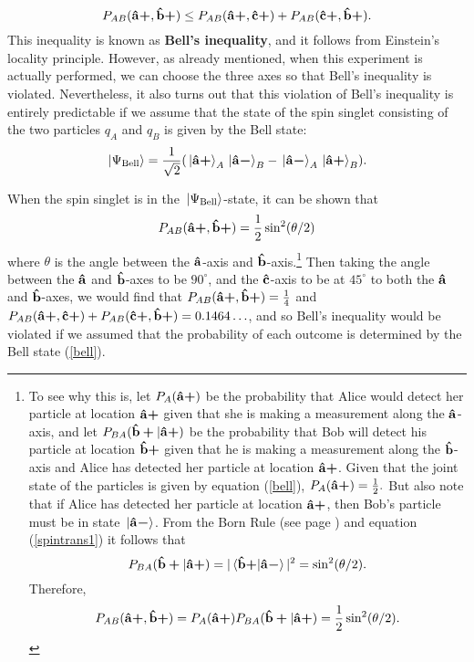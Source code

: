        \begin{equation}\label{bellinequality}
      P_{AB}(\vb{\hat{{a}}}\bm{+},\vb{\hat{{b}}}\bm{+})\leq P_{AB}(\vb{\hat{{a}}}\bm{+},\vb{\hat{{c}}}\bm{+})+P_{AB}(\vb{\hat{{c}}}\bm{+},\vb{\hat{{b}}}\bm{+}).
      \end{equation}
This inequality is known as \textbf{Bell's inequality}, and it follows from Einstein's locality principle.  However, as already mentioned, when this experiment is actually performed, we can choose the three axes so that Bell's inequality is violated. Nevertheless,  it also turns out that this violation of Bell's inequality is entirely predictable if we assume that the state of the spin singlet consisting of the two particles $q_A$ and $q_B$ is given by the Bell state: 
    \begin{equation}
      \ket*{\Psi_{\text{Bell}}}=\frac{1}{\sqrt{2}}(\ket*{\vb{\hat{{a}}}\bm{+}}_A\ket*{\vb{\hat{{a}}}\bm{-}}_B-\ket*{\vb{\hat{{a}}}\bm{-}}_A\ket*{\vb{\hat{{a}}}\bm{+}}_B).
    \end{equation}
      
When the spin singlet is in the $\ket*{\Psi_{\text{Bell}}}$-state, it can be shown that 
      \begin{equation*}\label{bellsin}
      P_{AB}(\vb{\hat{{a}}}\bm{+},\vb{\hat{{b}}}\bm{+})=\frac{1}{2}\sin^2(\theta/2)
      \end{equation*}
where $\theta$ is the angle between the $\vb{\hat{{a}}}$-axis and $\vb{\hat{{b}}}$-axis.\footnote{To see why this is, let $P_A(\vb{\hat{{a}}}\bm{+})$ be the probability that Alice would detect her particle at location $\vb{\hat{{a}}}\bm{+}$ given that she is making a measurement along the $\vb{\hat{{a}}}$-axis, and let $P_{BA}(\vb{\hat{{b}}}\bm{+}|\vb{\hat{{a}}}\bm{+})$ be the probability that Bob will detect his particle at location $\vb{\hat{{b}}}\bm{+}$ given that he is making a measurement along the $\vb{\hat{{b}}}$-axis and Alice has detected her particle at location $\vb{\hat{{a}}}\bm{+}$. Given that the joint state of the particles is given by equation (\ref{bell}), $P_A(\vb{\hat{{a}}}\bm{+})=\frac{1}{2}.$ But also note that if  Alice has detected her particle at location $\vb{\hat{{a}}}\bm{+}$, then Bob's particle must be in state $\ket*{\vb{\hat{{a}}}\bm{-}}$. From the Born Rule (see page \pageref{bornrule}) and equation (\ref{spintrans1}) it follows that 
      $$P_{BA}(\uvbp{b}|\uvbp{a})= |\ip*{\uvbp{b}}{\uvbm{a}}|^2=\sin^2(\theta/2).$$ 
Therefore, 
$$P_{AB}(\vb{\hat{{a}}}\bm{+},\vb{\hat{{b}}}\bm{+})= P_A(\vb{\hat{{a}}}\bm{+})P_{BA}(\vb{\hat{{b}}}\bm{+}|\vb{\hat{{a}}}\bm{+})=\frac{1}{2}\sin^2(\theta/2).$$} 
Then taking the angle between the $\vb{\hat{{a}}}$ and $\vb{\hat{{b}}}$-axes to be $90^\circ$, and the $\vb{\hat{{c}}}$-axis to be at $45^\circ$ to both the $\vb{\hat{{a}}}$ and $\vb{\hat{{b}}}$-axes, we would find that $P_{AB}(\vb{\hat{{a}}}\bm{+},\vb{\hat{{b}}}\bm{+})=\frac{1}{4}$ and $P_{AB}(\vb{\hat{{a}}}\bm{+},\vb{\hat{{c}}}\bm{+})+P_{AB}(\vb{\hat{{c}}}\bm{+},\vb{\hat{{b}}}\bm{+})=0.1464\ldots$, and so Bell's inequality would be violated if we assumed that the probability of each outcome is determined by the Bell state  (\ref{bell}). 
      